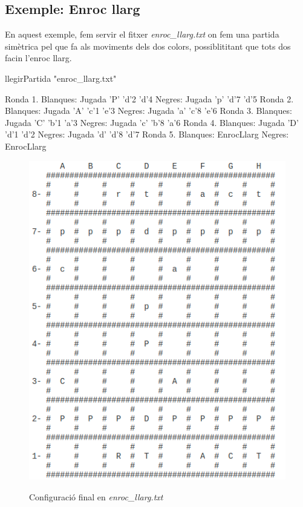 \documentclass{article}
\begin{document}
\subsection{Exemple: Enroc llarg}

En aquest exemple, fem servir el fitxer \textit{enroc\_llarg.txt} on fem una partida simètrica pel que fa als moviments dels dos colors, possiblititant que tots dos facin l'enroc llarg.
\begin{tcolorbox}
llegirPartida "enroc\_llarg.txt"
\end{tcolorbox}
\begin{tcolorbox}
Ronda 1.
Blanques: Jugada 'P' 'd'2 'd'4
Negres:   Jugada 'p' 'd'7 'd'5
Ronda 2.
Blanques: Jugada 'A' 'c'1 'e'3
Negres:   Jugada 'a' 'c'8 'e'6
Ronda 3.
Blanques: Jugada 'C' 'b'1 'a'3
Negres:   Jugada 'c' 'b'8 'a'6
Ronda 4.
Blanques: Jugada 'D' 'd'1 'd'2
Negres:   Jugada 'd' 'd'8 'd'7
Ronda 5.
Blanques: EnrocLlarg 
Negres: EnrocLlarg  
\end{tcolorbox}
\begin{figure}[ht]
\centering
\includegraphics[scale=0.45]{enroc.png}
\begin{center}Configuració final en \textit{enroc\_llarg.txt}\end{center}
\end{figure}
\end{document}
